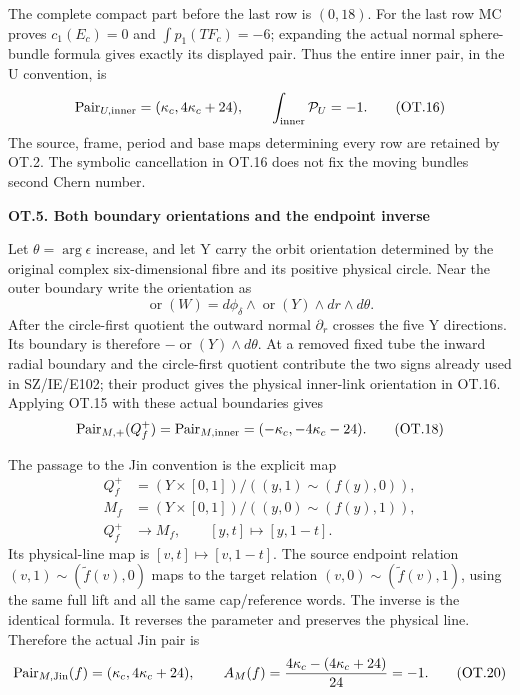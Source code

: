 The complete compact part before the last row is \((0,18)\).
For the last row MC proves \(c_1(E_c)=0\) and
\(\int p_1(TF_c)=-6\); expanding the actual normal sphere-bundle
formula gives exactly its displayed pair. Thus the entire inner
pair, in the U convention, is
\[
\operatorname{Pair}_{U,\rm inner}=(\kappa_c,4\kappa_c+24),
\qquad \int_{\rm inner}\mathcal P_U=-1.                \tag{OT.16}
\]
The source, frame, period and base maps determining every row
are retained by OT.2. The symbolic cancellation in OT.16 does
not fix the moving bundle\textquotesingle s second Chern number.

\par

\medskip\noindent\textbf{OT.5. Both boundary orientations and the endpoint inverse}

\par\nobreak

Let \(\theta=\arg\epsilon\) increase, and let Y carry the orbit
orientation determined by the original complex six-dimensional
fibre and its positive physical circle. Near the outer boundary
write the orientation as
\[
\operatorname{or}(W)=d\phi_\delta\wedge\operatorname{or}(Y)
                           \wedge dr\wedge d\theta.
                                                               \tag{OT.17}
\]
After the circle-first quotient the outward normal \(\partial_r\)
crosses the five Y directions. Its boundary is therefore
\(-\operatorname{or}(Y)\wedge d\theta\). At a removed fixed
tube the inward radial boundary and the circle-first quotient
contribute the two signs already used in SZ/IE/E102; their
product gives the physical inner-link orientation in OT.16.
Applying OT.15 with these actual boundaries gives
\[
\operatorname{Pair}_{M,+}(Q_f^+)
 =\operatorname{Pair}_{M,\rm inner}
 =(-\kappa_c,-4\kappa_c-24).                           \tag{OT.18}
\]

The passage to the Jin convention is the explicit map
\[
\begin{aligned}
Q_f^+&=(Y\times[0,1])/((y,1)\sim(f(y),0)),\\
M_f&=(Y\times[0,1])/((y,0)\sim(f(y),1)),\\
Q_f^+&\longrightarrow M_f,\qquad [y,t]\longmapsto[y,1-t].
\end{aligned}                                                   \tag{OT.19}
\]
Its physical-line map is \([v,t]\mapsto[v,1-t]\). The source
endpoint relation \((v,1)\sim(\widetilde f(v),0)\) maps to the
target relation \((v,0)\sim(\widetilde f(v),1)\), using the same
full lift and all the same cap/reference words. The inverse is
the identical formula. It reverses the parameter and preserves
the physical line. Therefore the actual Jin pair is
\[
\operatorname{Pair}_{M,\rm Jin}(f)
      =(\kappa_c,4\kappa_c+24),\qquad
A_M(f)=\frac{4\kappa_c-(4\kappa_c+24)}{24}=-1.          \tag{OT.20}
\]

